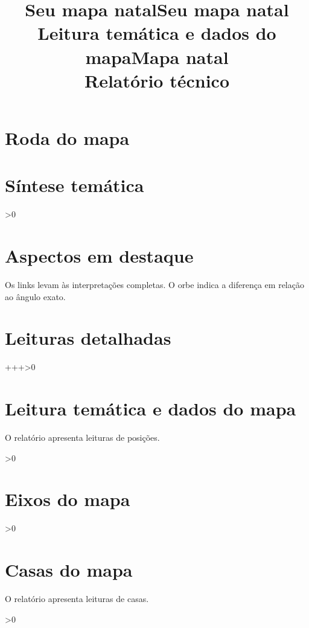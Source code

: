 \documentclass[a4paper,11pt]{article}
\title{Seu mapa natal}
\title{Seu mapa natal\\\large Leitura temática e dados do mapa}
\title{Mapa natal\\\large Relatório técnico}
\author{}
\date{}
\begin{document}
\maketitle
\section{Roda do mapa}
\begin{center}\NatalChartInternal\end{center}
\clearpage
\ifnum{}
  
\else
  \section*{Síntese temática}
  \NatalSinteseTematica
\fi
\ifnum\NatalTotalDestaques>0
  \section*{Aspectos em destaque}
  Os links levam às interpretações completas. O orbe indica a diferença em relação ao ângulo exato.
  \begin{itemize}
    \NatalDestaques
  \end{itemize}
\fi
\clearpage
\appendix
\section{Leituras detalhadas}
  \ifnum\numexpr\NatalTotalLeituras+\NatalTotalEixos+\NatalTotalCasas+\NatalTotalAspectos\relax>0
    \section*{Leitura temática e dados do mapa}
    O relatório apresenta \NatalTotalLeituras\space leituras de posições.\par
    
    \NatalLeiturasSelecionadas
    \ifnum\NatalTotalEixos>0
      \section*{Eixos do mapa}
      \NatalLeiturasEixos
    \fi
    \ifnum\NatalTotalCasas>0
      \section*{Casas do mapa}
      O relatório apresenta \NatalTotalCasas\space leituras de casas.\par
      
      \NatalLeiturasCasas
    \fi
    \ifnum\NatalTotalAspectos>0
\end{document}
